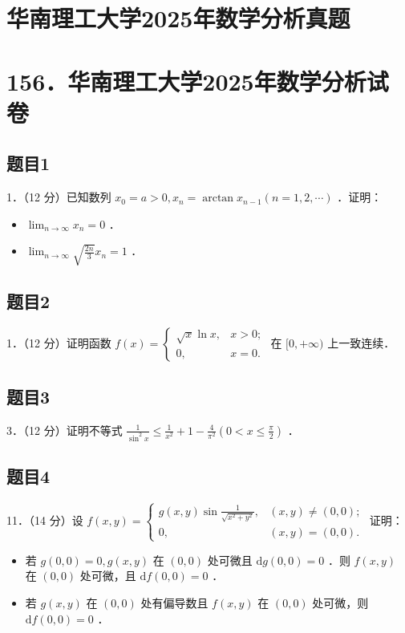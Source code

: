 \documentclass{article}
\begin{document}
\section*{华南理工大学2025年数学分析真题}
\section*{156．华南理工大学2025年数学分析试卷}

\subsection{题目1}
1．（12 分）已知数列 \(x_{0}=a>0, x_{n}=\arctan x_{n-1}(n=1,2, \cdots)\) ．证明：

\begin{itemize}
  \item[（1）] \(\lim _{n \rightarrow \infty} x_{n}=0\) ．
  \item[（2）] \(\lim _{n \rightarrow \infty} \sqrt{\frac{2 n}{3}} x_{n}=1\) ．
\end{itemize}

\subsection{题目2}
1．（12 分）证明函数 \(f(x)=\left\{\begin{array}{ll}\sqrt{x} \ln x, & x>0 ; \\ 0, & x=0 .\end{array}\right.\) 在 \([0,+\infty)\) 上一致连续．\\

\subsection{题目3}
3．（12 分）证明不等式 \(\frac{1}{\sin ^{2} x} \leq \frac{1}{x^{2}}+1-\frac{4}{\pi^{2}}\left(0<x \leq \frac{\pi}{2}\right)\) ．\\

\subsection{题目4}
11．（14 分）设 \(f(x, y)=\left\{\begin{array}{ll}g(x, y) \sin \frac{1}{\sqrt{x^{2}+y^{2}}}, & (x, y) \neq(0,0) ; \\ 0, & (x, y)=(0,0) .\end{array}\right.\) 证明：

\begin{itemize}
  \item[（1）] 若 \(g(0,0)=0, g(x, y)\) 在 \((0,0)\) 处可微且 \(\mathrm{d} g(0,0)=0\) ．则 \(f(x, y)\) 在 \((0,0)\) 处可微，且 \(\mathrm{d} f(0,0)=0\) ．
  \item[（2）] 若 \(g(x, y)\) 在 \((0,0)\) 处有偏导数且 \(f(x, y)\) 在 \((0,0)\) 处可微，则 \(\mathrm{d} f(0,0)=0\) ．
\end{itemize}
\end{document}
